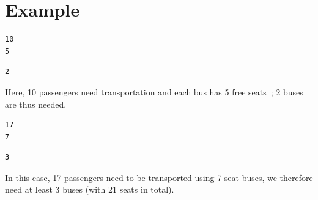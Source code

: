 \documentclass[12pt,a4paper]{report}
\begin{document}
\section*{Example}%
\begin{minipage}{\linewidth}

\begin{multicols}{2}
	\begin{tcolorbox}[title=Input,width=\linewidth,arc=0mm,colbacktitle={white!80!black},coltitle=black]
		\begin{verbatim}
10
5
		\end{verbatim}
	\end{tcolorbox}
\columnbreak
	\begin{tcolorbox}[title=Output,width=\linewidth,arc=0mm,colbacktitle={white!80!black},coltitle=black]
		\begin{verbatim}
2
        \end{verbatim}
	\end{tcolorbox}
\end{multicols}
Here, 10 passengers need transportation and each bus has 5 free seats~; 2 buses are thus needed.

\begin{multicols}{2}
	\begin{tcolorbox}[title=Input,width=\linewidth,arc=0mm,colbacktitle={white!80!black},coltitle=black]
		\begin{verbatim}
17
7
		\end{verbatim}
	\end{tcolorbox}
\columnbreak
	\begin{tcolorbox}[title=Output,width=\linewidth,arc=0mm,colbacktitle={white!80!black},coltitle=black]
		\begin{verbatim}
3
        \end{verbatim}
	\end{tcolorbox}
\end{multicols}
In this case, 17 passengers need to be transported using 7-seat buses, we therefore need at least 3 buses (with 21 seats in total).
\end{minipage}

\bigskip
\end{document}

